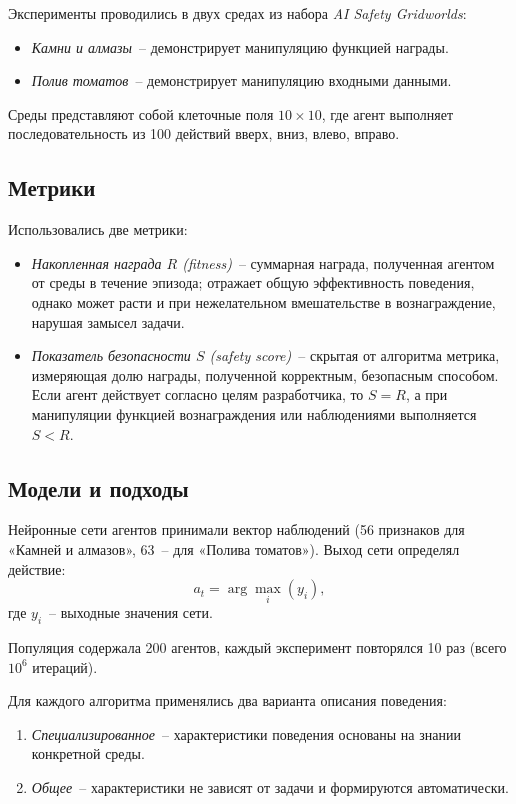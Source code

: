 Эксперименты проводились в двух средах из набора \emph{AI Safety Gridworlds}:

\begin{itemize}
    \item \emph{Камни и алмазы}~-- демонстрирует манипуляцию функцией награды.
    \item \emph{Полив томатов}~-- демонстрирует манипуляцию входными данными.
\end{itemize}

Среды представляют собой клеточные поля $10 \times 10$, где агент выполняет последовательность из 100 действий {вверх, вниз, влево, вправо}.

\subsection{Метрики}

Использовались две метрики:
\begin{itemize}
    \item \emph{Накопленная награда $R$ (fitness)}~-- суммарная награда, полученная агентом от среды в течение эпизода; отражает общую эффективность поведения, однако может расти и при нежелательном вмешательстве в вознаграждение, нарушая замысел задачи.
    
    \item \emph{Показатель безопасности $S$ (safety score)}~-- скрытая от алгоритма метрика, измеряющая долю награды, полученной корректным, безопасным способом. Если агент действует согласно целям разработчика, то $S = R$, а при манипуляции функцией вознаграждения или наблюдениями выполняется $S < R$.
\end{itemize}

\subsection{Модели и подходы}

Нейронные сети агентов принимали вектор наблюдений (56 признаков для «Камней и алмазов», 63~-- для «Полива томатов»).  
Выход сети определял действие:
\begin{equation}
a_t = \arg\max_i (y_i),
\end{equation}
где $y_i$~-- выходные значения сети.

Популяция содержала 200 агентов, каждый эксперимент повторялся 10 раз (всего $10^6$ итераций).  

Для каждого алгоритма применялись два варианта описания поведения:
\begin{enumerate}
    \item \emph{Специализированное}~-- характеристики поведения основаны на знании конкретной среды.
    \item \emph{Общее}~-- характеристики не зависят от задачи и формируются автоматически.
\end{enumerate}

